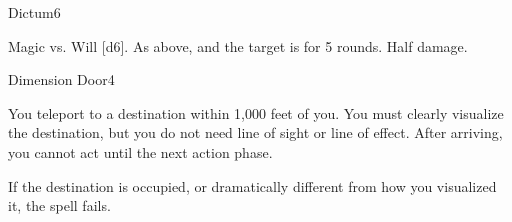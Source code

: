 \begin{spellsection}{Dictum}{6}
    \begin{spellheader}
    \end{spellheader}
    \begin{spellcontent}
        \begin{spelltargetinginfo}
        \end{spelltargetinginfo}
        \begin{spelleffects}
            \begin{spellattack}{Magic vs. Will}
                \spellsuccess {}[d6].
                \spellcritical As above, and the target is \immobilized for 5 rounds.
                \spellfailure Half damage.
            \end{spellattack}
        \end{spelleffects}
    \end{spellcontent}
    \begin{spellfooter}
        \miscastexplode
    \end{spellfooter}
\end{spellsection}

\begin{spellsection}{Dimension Door}{4}
    \begin{spellheader}
    \end{spellheader}
    \begin{spellcontent}
        \begin{spelltargetinginfo}
        \end{spelltargetinginfo}
        \begin{spelleffects}
            \spelleffect You teleport to a destination within 1,000 feet of you. You must clearly visualize the destination, but you do not need line of sight or line of effect. After arriving, you cannot act until the next action phase.

            If the destination is occupied, or dramatically different from how you visualized it, the spell fails.
        \end{spelleffects}
    \end{spellcontent}
    \begin{spellfooter}
        \miscastexplode
    \end{spellfooter}
\end{spellsection}

